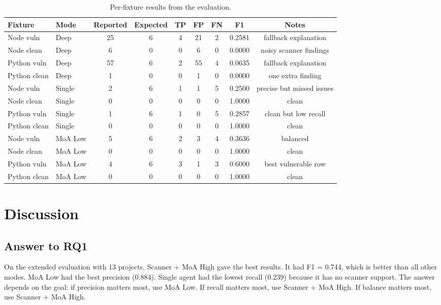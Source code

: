 \documentclass[sigconf,nonacm]{acmart}
\begin{document}
\begin{table}
  \caption{Per-fixture results from the evaluation.}
  \label{tab:fixture-results}
  \centering
  \scriptsize
  \begin{tabular}{llccccccc}
    \toprule
    Fixture & Mode & Reported & Expected & TP & FP & FN & F1 & Notes \\
    \midrule
    Node vuln & Deep & 25 & 6 & 4 & 21 & 2 & 0.2581 & fallback explanation \\
    Node clean & Deep & 6 & 0 & 0 & 6 & 0 & 0.0000 & noisy scanner findings \\
    Python vuln & Deep & 57 & 6 & 2 & 55 & 4 & 0.0635 & fallback explanation \\
    Python clean & Deep & 1 & 0 & 0 & 1 & 0 & 0.0000 & one extra finding \\
    Node vuln & Single & 2 & 6 & 1 & 1 & 5 & 0.2500 & precise but missed issues \\
    Node clean & Single & 0 & 0 & 0 & 0 & 0 & 1.0000 & clean \\
    Python vuln & Single & 1 & 6 & 1 & 0 & 5 & 0.2857 & clean but low recall \\
    Python clean & Single & 0 & 0 & 0 & 0 & 0 & 1.0000 & clean \\
    Node vuln & MoA Low & 5 & 6 & 2 & 3 & 4 & 0.3636 & balanced \\
    Node clean & MoA Low & 0 & 0 & 0 & 0 & 0 & 1.0000 & clean \\
    Python vuln & MoA Low & 4 & 6 & 3 & 1 & 3 & 0.6000 & best vulnerable row \\
    Python clean & MoA Low & 0 & 0 & 0 & 0 & 0 & 1.0000 & clean \\
    \bottomrule
  \end{tabular}
\end{table}

\section{Discussion}
\subsection{Answer to RQ1}

On the extended evaluation with 13 projects, Scanner + MoA High gave the best results. It had F1 = 0.744, which is better than all other modes. MoA Low had the best precision (0.884). Single agent had the lowest recall (0.239) because it has no scanner support. The answer depends on the goal: if precision matters most, use MoA Low. If recall matters most, use Scanner + MoA High. If balance matters most, use Scanner + MoA High.
\end{document}
